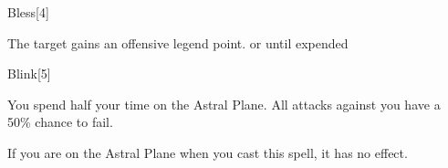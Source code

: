 \begin{spellsection}[Mass]{Bless}[4]
    \begin{spellheader}
    \end{spellheader}
    \begin{spellcontent}
        \begin{spelltargetinginfo}
        \end{spelltargetinginfo}
        \begin{spelleffects}
            \spelleffect The target gains an offensive legend point.
            \spelldur \durshort or until expended
        \end{spelleffects}
    \end{spellcontent}
    \begin{spellfooter}
        \miscastexplode
    \end{spellfooter}
\end{spellsection}

\begin{spellsection}{Blink}[5]
    \begin{spellheader}
    \end{spellheader}
    \begin{spellcontent}
        \begin{spelltargetinginfo}
        \end{spelltargetinginfo}
        \begin{spelleffects}
            \spelleffect You spend half your time on the Astral Plane. All attacks against you have a 50\% chance to fail.
            \spelldur \durshort \dismissable
        \end{spelleffects}
    \end{spellcontent}
    \begin{spellfooter}
        \spellnotes If you are on the Astral Plane when you cast this spell, it has no effect.
        \miscastexplode
    \end{spellfooter}
\end{spellsection}

